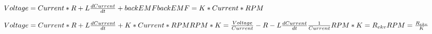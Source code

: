$Voltage = Current * R + L \frac{dCurrent}{dt} + backEMF\\
\\
backEMF = K*Current*RPM$


$Voltage = Current * R + L \frac{dCurrent}{dt} + K * Current * RPM\\
\\
RPM*K = \frac{Voltage}{Current} - R - L \frac{dCurrent}{dt} \frac{1}{Current}\\
\\
RPM*K = R_{ekv}\\
\\
RPM = \frac{R_{ekv}}{K}$
